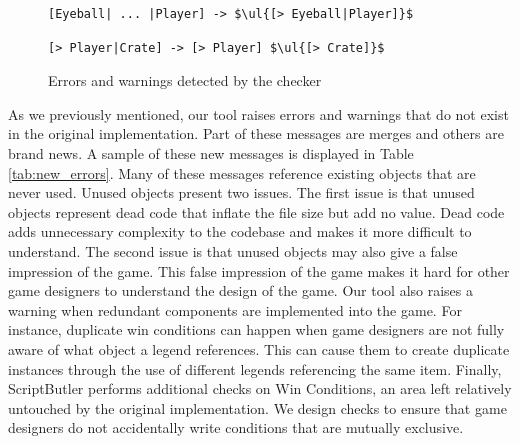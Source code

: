 \begin{figure}
\begin{minipage}{\columnwidth}
\begin{lstlisting}[language=PuzzleScript, basicstyle=\ttfamily\footnotesize]
[Eyeball| ... |Player] -> $\ul{[> Eyeball|Player]}$
\end{lstlisting}
\vspace*{-4pt}
\end{minipage}
\medskip

\begin{minipage}{\columnwidth}
\begin{lstlisting}[language=PuzzleScript, xleftmargin=10pt, basicstyle=\ttfamily\footnotesize]
[> Player|Crate] -> [> Player] $\ul{[> Crate]}$
\end{lstlisting}
\vspace*{-4pt}
\end{minipage}

\caption{Errors and warnings detected by the checker}
\label{fig:ErrorsWarnings}
\vspace*{-8pt}
\end{figure}

As we previously mentioned, our tool raises errors and warnings that do not exist in the original implementation. Part of these messages are merges and others are brand news\dd. A sample of these new messages is displayed in Table \ref{tab:new_errors}. Many of these messages reference existing objects that are never used. Unused objects present two issues. The first issue is that unused objects represent dead code that inflate the file size but add no value. Dead code adds unnecessary complexity to the codebase and makes it more difficult to understand. The second issue is that unused objects may also give a false impression of the game. This false impression of the game makes it hard for other game designers to understand the design of the game. Our tool also raises a warning when redundant components are implemented into the game. For instance, duplicate win conditions can happen when game designers are not fully aware of what object a legend references. This can cause them to create duplicate instances through the use of different legends referencing the same item. Finally, ScriptButler performs additional checks on Win Conditions, an area left relatively untouched by the original implementation. We design checks to ensure that game designers do not accidentally write conditions that are mutually exclusive.

